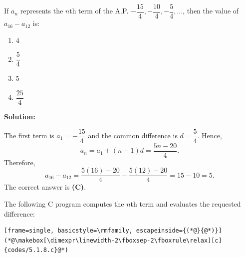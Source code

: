 \documentclass[journal]{IEEEtran}
\begin{document}
\begin{list}{}{\setlength{\leftmargin}{1.15cm}\setlength{\labelwidth}{1.0cm}\setlength{\labelsep}{0.15cm}\setlength{\itemindent}{0pt}\setlength{\listparindent}{0pt}\setlength{\parsep}{0pt}\setlength{\topsep}{0pt}}
\item[5.1.8] If $a_n$ represents the $n$th term of the A.P. $-\dfrac{15}{4},-\dfrac{10}{4},-\dfrac{5}{4},\ldots$, then the value of $a_{16}-a_{12}$ is:

\begin{enumerate}
    \item[(A)] $4$
    \item[(B)] $\dfrac{5}{4}$
    \item[(C)] $5$
    \item[(D)] $\dfrac{25}{4}$
\end{enumerate}

\vspace{0.7em}\par\noindent\textbf{Solution:}

The first term is $a_1=-\dfrac{15}{4}$ and the common difference is $d=\dfrac{5}{4}$. Hence,
\[
a_n=a_1+(n-1)d=\frac{5n-20}{4}.
\]
Therefore,
\[
a_{16}-a_{12}=\frac{5(16)-20}{4}-\frac{5(12)-20}{4}=15-10=5.
\]
The correct answer is \textbf{(C)}.

The following C program computes the $n$th term and evaluates the requested difference:
\begin{lstlisting}[frame=single, basicstyle=\rmfamily, escapeinside={(*@}{@*)}]
(*@\makebox[\dimexpr\linewidth-2\fboxsep-2\fboxrule\relax][c]{codes/5.1.8.c}@*)
\end{lstlisting}

\end{list}
\vspace{1.2em}
\end{document}

